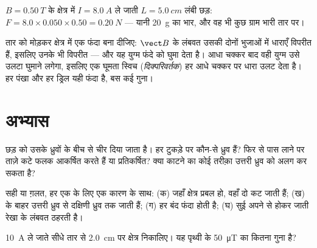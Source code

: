 \begin{example}[लाप्लास के आँकड़े]\label{ex:g11:magnetic-fields:laplace}
$B = \qty{0.50}{T}$ के क्षेत्र में $I = \qty{8.0}{A}$ ले जाती $L = \qty{5.0}{cm}$ लंबी छड़: $F = 8.0 \times 0.050 \times 0.50 = \qty{0.20}{N}$ --- यानी \qty{20}{g}
का भार, और वह भी कुछ ग्राम भारी तार पर।
\end{example}

\begin{remark}[दिष्ट धारा मोटर]\label{rem:g11:magnetic-fields:motor}
तार को मोड़कर क्षेत्र में एक फंदा बना दीजिए: $\vect B$ के लंबवत उसकी
दोनों भुजाओं में धाराएँ विपरीत हैं, इसलिए उनके  भी विपरीत
--- और यह युग्म फंदे को घुमा देता है। आधा चक्कर बाद वही युग्म उसे उलटा घुमाने
लगेगा, इसलिए एक घूमता स्विच (\emph{दिक्परिवर्तक}) हर आधे
चक्कर पर धारा उलट देता है। हर पंखा और हर ड्रिल यही फंदा है, बस कई गुना।
\end{remark}

\section{अभ्यास}

\begin{exercise}[$\star$]\label{exo:g11:magnetic-fields:1}
छड़  को उसके ध्रुवों के बीच से चीर दिया जाता है। हर टुकड़े पर
कौन-से ध्रुव हैं? फिर से पास लाने पर ताज़े कटे फलक आकर्षित करते हैं या
प्रतिकर्षित? क्या काटने का कोई तरीक़ा उत्तरी ध्रुव को अलग कर सकता है?
\end{exercise}

\begin{exercise}[$\star$]\label{exo:g11:magnetic-fields:2}
सही या ग़लत, हर एक के लिए एक कारण के साथ: (क) जहाँ क्षेत्र प्रबल
हो, वहाँ दो  कट जाती हैं; (ख) 
के बाहर  उत्तरी ध्रुव से दक्षिणी ध्रुव तक जाती हैं;
(ग) हर  बंद फंदा होती है; (घ) सुई अपने से होकर
जाती रेखा के लंबवत ठहरती है।
\end{exercise}

\begin{exercise}[$\star$]\label{exo:g11:magnetic-fields:3}
\qty{10}{A} ले जाते सीधे तार से \qty{2.0}{cm} पर क्षेत्र निकालिए। यह पृथ्वी
के \qty{50}{\micro T} का कितना गुना है?
\end{exercise}

